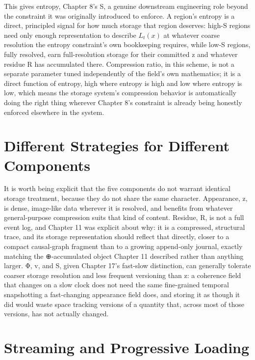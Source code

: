 This gives entropy, Chapter 8's S, a genuine downstream engineering role beyond the constraint it was originally introduced to enforce. A region's entropy is a direct, principled signal for how much storage that region deserves: high-S regions need only enough representation to describe \(L_t(x)\) at whatever coarse resolution the entropy constraint's own bookkeeping requires, while low-S regions, fully resolved, earn full-resolution storage for their committed z and whatever residue R has accumulated there. Compression ratio, in this scheme, is not a separate parameter tuned independently of the field's own mathematics; it is a direct function of entropy, high where entropy is high and low where entropy is low, which means the storage system's compression behavior is automatically doing the right thing wherever Chapter 8's constraint is already being honestly enforced elsewhere in the system.

\section{Different Strategies for Different Components}

It is worth being explicit that the five components do not warrant identical storage treatment, because they do not share the same character. Appearance, z, is dense, image-like data wherever it is resolved, and benefits from whatever general-purpose compression suits that kind of content. Residue, R, is not a full event log, and Chapter 11 was explicit about why: it is a compressed, structural trace, and its storage representation should reflect that directly, closer to a compact causal-graph fragment than to a growing append-only journal, exactly matching the ⊕-accumulated object Chapter 11 described rather than anything larger. Φ, v, and S, given Chapter 17's fast-slow distinction, can generally tolerate coarser storage resolution and less frequent versioning than z: a coherence field that changes on a slow clock does not need the same fine-grained temporal snapshotting a fast-changing appearance field does, and storing it as though it did would waste space tracking versions of a quantity that, across most of those versions, has not actually changed.

\section{Streaming and Progressive Loading}

